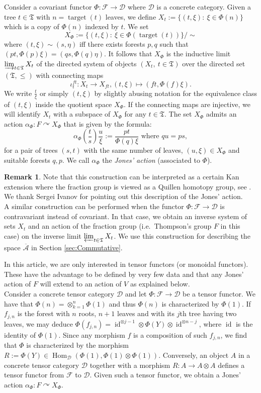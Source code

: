 \documentclass[a4paper,12pt]{amsart}
\numberwithin{equation}{section}
\theoremstyle{definition}
\newtheorem{remark}[theo]{Remark}
\DeclareMathOperator{\id}{id}
\newcommand{\act}{\curvearrowright}
\newcommand{\oscrA}{{\overline{\mathscr{A}}}}
\newcommand{\cD}{\mathcal D}
\newcommand{\cF}{\mathcal F}
\DeclareMathOperator{\Hom}{Hom}
\newcommand{\ot}{\otimes}\newcommand{\otmin}{\otimes_{\text{min}}}
\newcommand{\fT}{\mathfrak T}
\DeclareMathOperator{\target}{target}
\begin{document}
Consider a covariant functor $\Phi:\cF\to \cD$ where $\cD$ is a concrete category. 
Given a tree $t\in\fT$ with $n=\target(t)$ leaves, we define $X_t:=\{ (t,\xi):\ \xi \in \Phi(n)\}$ which is a copy of $\Phi(n)$ indexed by $t$.
We set 
$$X_\Phi:=\{(t,\xi):\ \xi\in \Phi(\target(t)) \}/\sim$$ where $(t,\xi)\sim (s,\eta)$ iff there exists forests $p,q$ such that $(pt,\Phi(p)\xi) = (qs,\Phi(q)\eta).$
It follows that $X_\Phi$ is the inductive limit $\varinjlim_{t\in\fT} X_t$ of the directed system of objects $(X_t,\ t\in\fT)$ over the directed set $(\fT,\leq)$ with connecting maps 
$$\iota_t^{ft}:X_t\to X_{ft}, (t,\xi)\mapsto (ft,\Phi(f)\xi).$$
We write $\tfrac{t}{\xi}$ or simply $(t,\xi)$ by slightly abusing notation for the equivalence class of $(t,\xi)$ inside the quotient space $X_\Phi$.
If the connecting maps are injective, we will identify $X_t$ with a subspace of $X_\Phi$ for any $t\in\fT$.
The set $X_\Phi$ admits an action $\alpha_\Phi:F\act X_\Phi$ that is given by the formula:
$$\alpha_\Phi\left( \dfrac{t}{s} \right) \dfrac{u}{\xi} := \dfrac{pt}{\Phi(q)\xi} \text{ where } {qu = ps},$$
for a pair of trees $(s,t)$ with the same number of leaves, $(u,\xi)\in X_{\Phi}$ and suitable forests $q,p$. 
We call $\alpha_{\Phi}$ the {\it Jones' action} (associated to $\Phi$).

\begin{remark}
Note that this construction can be interpreted as a certain Kan extension where the fraction group is viewed as a Quillen homotopy group, see {\cite[Appendix]{Brothier19WP}}. 
We thank Sergei Ivanov for pointing out this description of the Jones' action.\\[0.1cm]

A similar construction can be performed when the functor $\Phi:\cF\to \cD$ is contravariant instead of covariant. 
In that case, we obtain an inverse system of sets $X_t$ and an action of the fraction group (i.e.~Thompson's group $F$ in this case) on the inverse limit $\varprojlim_{t\in\fT} X_t$.
We use this construction for describing the space $\oscrA$ in Section \ref{sec:Commutative}.\end{remark}

In this article, we are only interested in tensor functors (or monoidal functors).
These have the advantage to be defined by very few data and that any Jones' action of $F$ will extend to an action of $V$ as explained below.\\[0.25cm]
Consider a concrete tensor category $\cD$ and let $\Phi:\cF\to \cD$ be a tensor functor.
We have that $\Phi(n)=\otimes_{k=1}^n \Phi(1)$ and thus $\Phi(n)$ is characterized by $\Phi(1).$
If $f_{j,n}$ is the forest with $n$ roots, $n+1$ leaves and with its $j$th tree having two leaves, we may deduce $\Phi(f_{j,n}) = \id^{\ot j-1}\ot \Phi(Y)\ot \id^{\ot n-j}$, where $\id$ is the identity of $\Phi(1).$
Since any morphism $f$ is a composition of such $f_{j,n}$, we find that $\Phi$ is characterized by the morphism $R:=\Phi(Y)\in \Hom_\cD(\Phi(1),  \Phi(1)\ot \Phi(1)).$
Conversely, an object $A$ in a concrete tensor category $\cD$ together with a morphism $R:A\to A\ot A$ defines a tensor functor from $\cF$ to $\cD.$
Given such a tensor functor, we obtain a Jones' action $\alpha_\Phi:F\act X_\Phi.$
\end{document}
